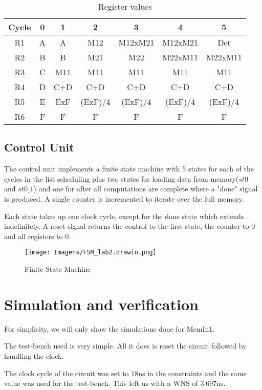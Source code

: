\documentclass[12pt]{article}
\begin{document}
\begin{table}[H]
	\center
	\begin{tabular}{|c|c|c|c|c|c|c|}
		\hline
		Cycle & 0 & 1& 2&3&4&5\\
        \hline
        R1 &A&A&M12&M12xM21&M12xM21&Det\\
        \hline
        R2 &B&B&M21&M22&M22xM11&M22xM11\\
        \hline
        R3&C&M11&M11&M11&M11&M11\\
        \hline
        R4&D&C+D&C+D&C+D&C+D&C+D\\
        \hline
        R5&E&ExF&(ExF)/4&(ExF)/4&(ExF)/4&(ExF)/4\\
        \hline
        R6&F&F&F&F&F&F\\
        \hline
	\end{tabular}
	\caption{Register values}
	\label{tab:reg}
\end{table}

\subsection{Control Unit}
The control unit implements a finite state machine with 5 states for each of the cycles in the list scheduling plus two states for loading data from memory($st0$ and $st0\_1$) and one for after all computations are complete where a "done" signal is produced. A single counter is incremented to iterate over the full memory.

Each state takes up one clock cycle, except for the done state which extends indefinitely. A reset signal returns the control to the first state, the counter to 0 and all registers to 0.

\begin{figure}[H]
	\centering
	\texttt{[image: Imagens/FSM\_lab2.drawio.png]}
	\caption{Finite State Machine}
	\label{fig:fsm}
\end{figure}
\section{Simulation and verification}

For simplicity, we will only show the simulations done for MemIn1.

The test-bench used is very simple. All it does is reset the circuit followed by handling the clock.

The clock cycle of the circuit was set to 18ns in the constraints and the same value was used for the test-bench. This left us with a WNS of 3.697ns.
\end{document}
